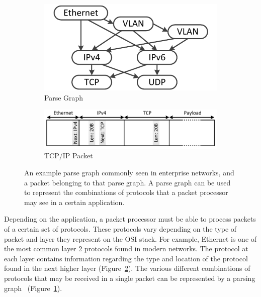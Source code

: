 %
%

\begin{figure}
\centering
%
        \begin{subfigure}[t]{0.5\textwidth}
        		\includegraphics[width=\textwidth]{figs/parse-graph.pdf}
        		\caption{Parse Graph}
        		\label{parse-graph}
		\end{subfigure}
        \begin{subfigure}[t]{0.5\textwidth}
        		\includegraphics[width=\textwidth]{figs/packet.pdf}
        		\caption{TCP/IP Packet}
        		\label{packet}
		\end{subfigure}
\caption{An example parse graph commonly seen in enterprise networks, and a packet belonging to that parse graph. A parse graph can be used to represent the combinations of protocols that a packet processor may see in a certain application.}
\label{parse-graph-packet}
\end{figure}
%

Depending on the application, a packet processor must be able to process packets of a certain set of protocols.
These protocols vary depending on the type of packet and layer they represent on the OSI stack.
For example, Ethernet is one of the most common layer 2 protocols found in modern networks.
The protocol at each layer contains information regarding the type and location of the protocol found in the next higher layer (Figure~\ref{packet}).
The various different combinations of protocols that may be received in a single packet can be represented by a parsing graph~\cite{gibb2013design} (Figure~\ref{parse-graph}).

